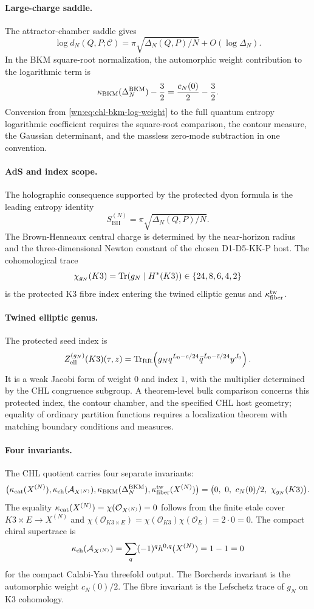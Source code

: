 \paragraph{Large-charge saddle.}
The attractor-chamber saddle gives
\[
  \log d_N(Q,P;\mathcal C)
  =
  \pi\sqrt{\Delta_N(Q,P)/N}+O(\log \Delta_N).
\label{wn:eq:chl-leading-entropy}
\]
In the BKM square-root normalization, the automorphic weight
contribution to the logarithmic term is
\[
  \kappa_{\mathrm{BKM}}(\Delta^{\mathrm{BKM}}_N)-\frac32
  =
  \frac{c_N(0)}2-\frac32 .
\label{wn:eq:chl-bkm-log-weight}
\]
Conversion from \eqref{wn:eq:chl-bkm-log-weight} to the full quantum
entropy logarithmic coefficient requires the square-root comparison,
the contour measure, the Gaussian determinant, and the massless
zero-mode subtraction in one convention.

\paragraph{AdS and index scope.}
The holographic consequence supported by the protected dyon formula is
the leading entropy identity
\[
  S_{\mathrm{BH}}^{(N)}
  =
  \pi\sqrt{\Delta_N(Q,P)/N}.
\]
The Brown-Henneaux central charge is determined by the near-horizon
radius and the three-dimensional Newton constant of the chosen
D1-D5-KK-P host. The cohomological trace
\[
  \chi_{g_N}(K3)=\mathrm{Tr}(g_N\mid H^*(K3))
  \in\{24,8,6,4,2\}
\]
is the protected K3 fibre index entering the twined elliptic genus and
\(\kappa_{\mathrm{fiber}}^{\mathrm{tw}}\).

\paragraph{Twined elliptic genus.}
The protected seed index is
\[
Z^{(g_N)}_{\mathrm{ell}}(K3)(\tau,z)
=
\mathrm{Tr}_{\mathrm{RR}}\!\left(
g_N q^{L_0-c/24}\bar q^{\bar L_0-\bar c/24}y^{J_0}
\right).
\label{wn:eq:chl-twined-elliptic-genus}
\]
It is a weak Jacobi form of weight \(0\) and index \(1\), with the
multiplier determined by the CHL congruence subgroup. A theorem-level
bulk comparison concerns this protected index, the contour chamber, and
the specified CHL host geometry; equality of ordinary partition
functions requires a localization theorem with matching boundary
conditions and measures.

\paragraph{Four invariants.}
The CHL quotient carries four separate invariants:
\[
\bigl(
  \kappa_{\mathrm{cat}}(X^{(N)}),
  \kappa_{\mathrm{ch}}(\mathcal A_{X^{(N)}}),
  \kappa_{\mathrm{BKM}}(\Delta^{\mathrm{BKM}}_N),
  \kappa_{\mathrm{fiber}}^{\mathrm{tw}}(X^{(N)})
\bigr)
=
\bigl(
  0,\ 0,\ c_N(0)/2,\ \chi_{g_N}(K3)
\bigr).
\label{wn:eq:chl-four-invariants}
\]
The equality \(\kappa_{\mathrm{cat}}(X^{(N)})=\chi(\mathcal O_{X^{(N)}})=0\) follows
from the finite etale cover \(K3\times E\to X^{(N)}\) and
\(\chi(\mathcal O_{K3\times E})=\chi(\mathcal O_{K3})\chi(\mathcal O_E)
=2\cdot0=0\). The compact chiral supertrace is
\[
  \kappa_{\mathrm{ch}}(\mathcal A_{X^{(N)}})=
  \sum_q(-1)^q h^{0,q}(X^{(N)})=1-1=0
\]
for the compact Calabi-Yau threefold output. The Borcherds invariant is
the automorphic weight \(c_N(0)/2\). The fibre invariant is the Lefschetz
trace of \(g_N\) on K3 cohomology.


